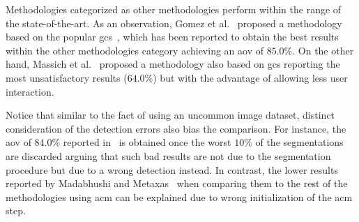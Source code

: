 \documentclass[authoryear,preprint,review,12pt]{elsarticle}
\begin{document}
Methodologies categorized as other methodologies perform within the range of the state-of-the-art. As an observation, Gomez et al.~\cite{Gomez:2010p14339} proposed a methodology based on the popular \ac{gcs}~\cite{Horsch:2001p6028}, which has been reported to obtain the best results within the other methodologies category achieving an \ac{aov} of $85.0\%$. 
On the other hand, Massich et al.~\cite{massich2010lesion} proposed a methodology also based on \ac{gcs} reporting the most unsatisfactory results ($64.0\%$) but with the advantage of allowing less user interaction.

Notice that similar to the fact of using an uncommon image dataset, distinct consideration of the detection errors also bias the comparison. For instance, the  \ac{aov} of $84.0\%$ reported in~\cite{Zhang:2010p14317}  is obtained once the worst $10\%$ of the segmentations are discarded arguing that such bad results are not due to the segmentation procedure but due to a wrong detection instead. In contrast, the lower results reported by Madabhushi and Metaxas~\cite{Madabhushi:2003p6036} when comparing them to the rest of the methodologies using \ac{acm} can be explained due to wrong initialization of the \ac{acm} step.

\end{document}
